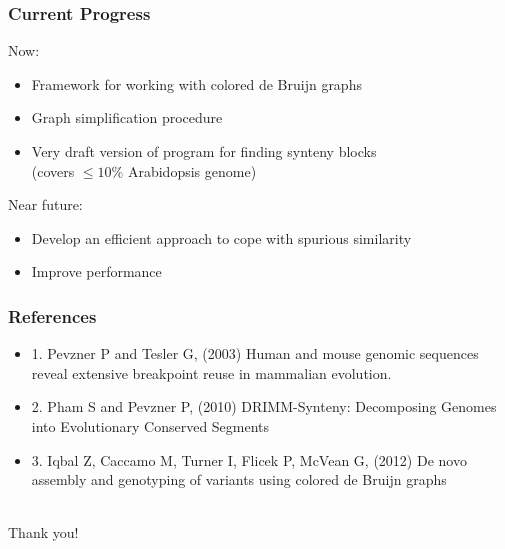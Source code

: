 \documentclass[svgnames,14pt]{beamer}
\begin{document}
\begin{frame}
\frametitle{Current Progress}
Now:
\begin{itemize}
\item Framework for working with colored de Bruijn graphs
\item Graph simplification procedure
\item Very draft version of program for finding synteny blocks \\ (covers \( \leq 10 \% \) Arabidopsis genome)
\end{itemize}
Near future:
\begin{itemize}
\item Develop an efficient approach to cope with spurious similarity
\item Improve performance
\end{itemize}
\end{frame}

\begin{frame}
\frametitle{References}
\begin{itemize}
\item 1. Pevzner P and Tesler G, (2003) Human and mouse genomic sequences reveal extensive breakpoint reuse in mammalian evolution. 
\item 2. Pham S and Pevzner P, (2010) DRIMM-Synteny: Decomposing Genomes into Evolutionary Conserved Segments
\item 3. Iqbal Z, Caccamo M, Turner I, Flicek P, McVean G, (2012) De novo assembly and genotyping of variants using colored de Bruijn graphs
\end{itemize}
\end{frame}

\begin{center}
\hfill \huge \\
\vspace{60pt}
Thank you!
\end{center}
\end{document}

